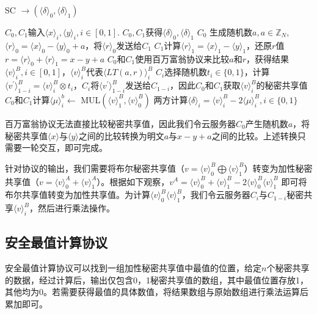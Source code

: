 \begin{algorithm}[htbp]
    \renewcommand{\algorithmicrequire}{\textbf{输入:}}
    \renewcommand{\algorithmicensure}{\textbf{输出:}}
    \caption{SC $\rightarrow (\langle \delta \rangle_0, \langle \delta \rangle_1)$}
    \label{alg_sc}
    \begin{algorithmic}[1]
        \REQUIRE $C_0,C_1$输入$\langle x \rangle_i, \langle y \rangle_i, i\in [0,1]$.
        \ENSURE $C_0,C_1$获得$\langle \delta\rangle_0, \langle \delta\rangle_1$
        \STATE $C_0$ 生成随机数$a, a\in \mathbb{Z}_N$, $\langle r \rangle_0=\langle x \rangle_0-\langle y\rangle_0+a$，将$\langle r \rangle_0$发送给$C_1$
        \STATE $C_1$计算$\langle r \rangle_1 = \langle x \rangle_1-\langle y\rangle_1$，还原$r$值$r=\langle r \rangle_0 + \langle r \rangle_1 = x-y+a$
        \STATE $C_0$和$C_1$使用百万富翁协议来比较$a$和$r$，获得结果$\langle v \rangle_i^B, i\in[0,1]$，$\langle v \rangle_i^B$代表$\langle LT(a,r)\rangle_i^B$
        \STATE $C_i$选择随机数$t_i \in \{0,1\}$，计算$\langle v^{'}\rangle_{1-i}^B=\langle v \rangle_i^B \otimes  t_i$，$C_i$将$\langle v^{'}\rangle_{1-i}^B$发送给$C_{1-i}$，因此$C_0$和$C_1$获取$\langle v \rangle_i^B$的秘密共享值
        \STATE $C_0$和$C_1$计算$\langle\mu \rangle_i^b \leftarrow$ MUL$(\langle v\rangle_1^B,\langle v\rangle_0^B)$
        \STATE 两方计算$ \langle \delta \rangle_i= \langle v \rangle_i^B -  2\langle\mu \rangle_i^B,i\in\{0, 1\}$

    \end{algorithmic}
\end{algorithm}

百万富翁协议无法直接比较秘密共享值，因此我们令云服务器$C_0$产生随机数$a$，将秘密共享值$\langle x \rangle$与$\langle y\rangle$之间的比较转换为明文$a$与$x-y+a$之间的比较。上述转换只需要一轮交互，即可完成。

针对协议的输出，我们需要将布尔秘密共享值（$v=\langle v\rangle^B_0 \bigoplus \langle v\rangle^B_1$）转变为加性秘密共享值（$v=\langle v\rangle^A_0+\langle v \rangle^A_1$）。根据如下观察，$v^A=\langle v\rangle^B_0+\langle v\rangle^B_1 - 2\langle v\rangle^B_0 \langle v\rangle^B_1$ 即可将布尔共享值转变为加性共享值。为计算$\langle v\rangle^B_0 \langle v\rangle^B_1$，我们令云服务器$C_i$与$C_{1-i}$秘密共享$\langle v \rangle_i^B$，然后进行乘法操作。


\subsection{安全最值计算协议}
安全最值计算协议可以找到一组加性秘密共享值中最值的位置，给定$ n $个秘密共享的数据，经过计算后，输出仅包含0，1秘密共享值的数组，其中最值位置存放1，其他均为0。若需要获得最值的具体数值，将结果数组与原始数组进行乘法运算后累加即可。


